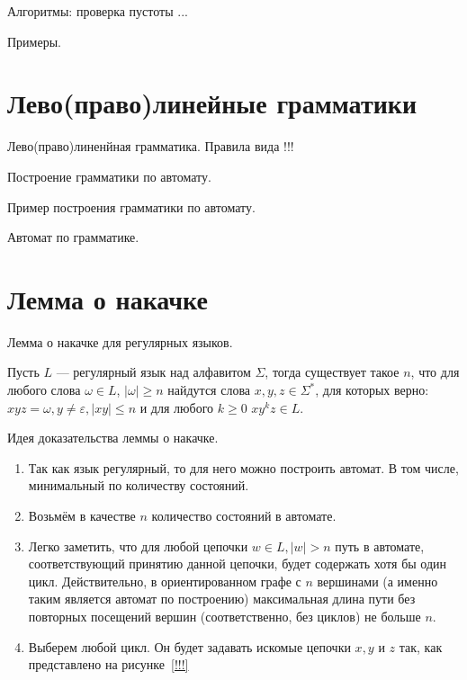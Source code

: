 Алгоритмы: проверка пустоты ... 

Примеры.



\section{Лево(право)линейные грамматики}

\begin{definition}
    Лево(право)линенйная грамматика. Правила вида  !!!
\end{definition}

Построение грамматики по автомату.

Пример построения грамматики по автомату.

Автомат по грамматике. 

\section{Лемма о накачке}

Лемма о накачке для регулярных языков.

\begin{lemma}
    Пусть $L$ --- регулярный язык над алфавитом $\Sigma$, тогда существует такое $n$, что для любого слова $\omega \in L$, $|\omega| \geq n$ найдутся слова $x,y,z\in \Sigma^*$, для которых верно: $xyz = \omega, y\neq \varepsilon,|xy|\leq n$ и для любого $k \geq 0$  $xy^kz \in L$.
\end{lemma}

Идея доказательства леммы о накачке.

\begin{enumerate}
    \item Так как язык регулярный, то для него можно построить автомат. В том числе, минимальный по количеству состояний.
    \item Возьмём в качестве $n$ количество состояний в автомате.
    \item Легко заметить, что для любой цепочки $w \in L, |w| > n$ путь в автомате, соответствующий принятию данной цепочки, будет содержать хотя бы один цикл.
          Действительно, в ориентированном графе с $n$ вершинами (а именно таким является автомат по построению) максимальная длина пути без повторных посещений вершин (соответственно, без циклов) не больше $n$.
    \item Выберем любой цикл. Он будет задавать искомые цепочки $x, y$ и $z$ так, как представлено на рисунке~\ref{!!!} 
\end{enumerate}


